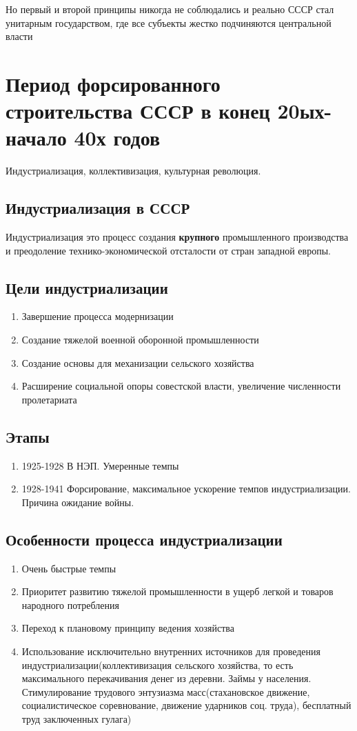 \documentclass[a4paper]{article}
\begin{document}
Но первый и второй принципы никогда не соблюдались и реально СССР стал унитарным государством, где все субъекты жестко подчиняются центральной власти

\section{Период форсированного строительства СССР в конец 20ых-начало 40х годов}
Индустриализация, коллективизация, культурная революция.
\subsection{Индустриализация в СССР}
Индустриализация это процесс создания \textbf{крупного} промышленного производства и преодоление технико-экономической отсталости от стран западной европы.

\subsection{Цели индустриализации}
\begin{enumerate}
    \item Завершение процесса модернизации
    \item Создание тяжелой военной оборонной промышленности
    \item Создание основы для механизации сельского хозяйства
    \item Расширение социальной опоры совестской власти, увеличение численности пролетариата
\end{enumerate}

\subsection{Этапы}
\begin{enumerate}
    \item 1925-1928 В НЭП. Умеренные темпы
    \item 1928-1941 Форсирование, максимальное ускорение темпов индустриализации. Причина ожидание войны.
\end{enumerate}

\subsection{Особенности процесса индустриализации}
\begin{enumerate}
    \item Очень быстрые темпы
    \item Приоритет развитию тяжелой промышленности в ущерб легкой и товаров народного потребления
    \item Переход к плановому принципу ведения хозяйства
    \item Использование исключительно внутренних источников для проведения индустриализации(коллективизация сельского хозяйства, то есть максимального перекачивания денег из деревни. Займы у населения. Стимулирование трудового энтузиазма масс(стахановское движение, социалистическое соревнование, движение ударников соц. труда), бесплатный труд заключенных гулага)
\end{enumerate}
\end{document}
